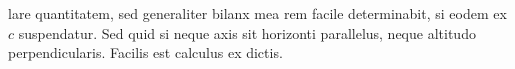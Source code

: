 \noindent {}lare quantitatem, sed generaliter bilanx\protect{} mea rem facile determinabit, si eodem  ex $c$ suspendatur. \pend \pstart Sed quid si neque axis sit horizonti parallelus, neque altitudo perpendicularis. Facilis est calculus ex dictis.
\pend
\newpage%
\pstart%
